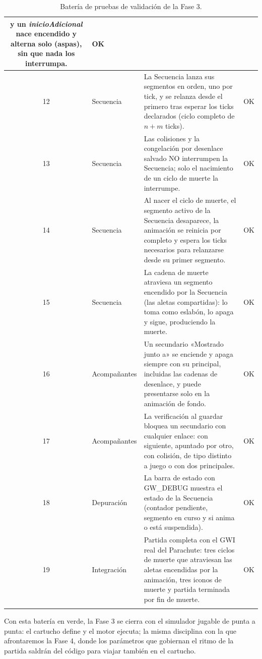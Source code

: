 \begin{longtable}{|c|l|p{8.2cm}|c|}
	y un \emph{inicioAdicional} nace encendido y alterna solo (aspas), sin
	que nada los interrumpa. & OK \\
	\hline
	12 & Secuencia & La Secuencia lanza sus segmentos en orden, uno por
	tick, y se relanza desde el primero tras esperar los ticks declarados
	(ciclo completo de $n + m$ ticks). & OK \\
	\hline
	13 & Secuencia & Las colisiones y la congelación por desenlace salvado
	NO interrumpen la Secuencia; solo el nacimiento de un ciclo de muerte
	la interrumpe. & OK \\
	\hline
	14 & Secuencia & Al nacer el ciclo de muerte, el segmento activo de la
	Secuencia desaparece, la animación se reinicia por completo y espera los
	ticks necesarios para relanzarse desde su primer segmento. & OK \\
	\hline
	15 & Secuencia & La cadena de muerte atraviesa un segmento encendido
	por la Secuencia (las aletas compartidas): lo toma como eslabón, lo apaga
	y sigue, produciendo la muerte. & OK \\
	\hline
	16 & Acompañantes & Un secundario «Mostrado junto a» se enciende y
	apaga siempre con su principal, incluidas las cadenas de desenlace, y
	puede presentarse solo en la animación de fondo. & OK \\
	\hline
	17 & Acompañantes & La verificación al guardar bloquea un secundario
	con cualquier enlace: con siguiente, apuntado por otro, con colisión,
	de tipo distinto a juego o con dos principales. & OK \\
	\hline
	18 & Depuración & La barra de estado con GW\_DEBUG muestra el estado de
	la Secuencia (contador pendiente, segmento en curso y si anima o está
	suspendida). & OK \\
	\hline
	19 & Integración & Partida completa con el GWI real del Parachute:
	tres ciclos de muerte que atraviesan las aletas encendidas por la
	animación, tres iconos de muerte y partida terminada por fin de
	muerte. & OK \\
	\hline
	\caption{Batería de pruebas de validación de la Fase 3.}
\end{longtable}

Con esta batería en verde, la Fase 3 se cierra con el simulador
jugable de punta a punta: el cartucho define y el motor ejecuta;
la misma disciplina con la que afrontaremos la Fase 4, donde los
parámetros que gobiernan el ritmo de la partida saldrán del código
para viajar también en el cartucho.

\clearpage